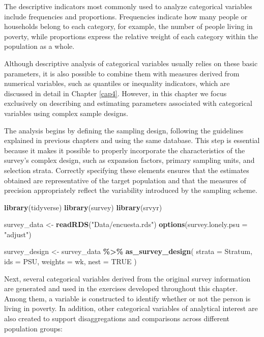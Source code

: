 \documentclass[
  english,
  12pt,
]{book}
\newenvironment{Shaded}{\begin{snugshade}}{\end{snugshade}}
\newcommand{\AttributeTok}[1]{\textcolor[rgb]{0.13,0.29,0.53}{#1}}
\newcommand{\ConstantTok}[1]{\textcolor[rgb]{0.56,0.35,0.01}{#1}}
\newcommand{\FunctionTok}[1]{\textcolor[rgb]{0.13,0.29,0.53}{\textbf{#1}}}
\newcommand{\NormalTok}[1]{#1}
\newcommand{\OtherTok}[1]{\textcolor[rgb]{0.56,0.35,0.01}{#1}}
\newcommand{\SpecialCharTok}[1]{\textcolor[rgb]{0.81,0.36,0.00}{\textbf{#1}}}
\newcommand{\StringTok}[1]{\textcolor[rgb]{0.31,0.60,0.02}{#1}}
\begin{document}
The descriptive indicators most commonly used to analyze categorical variables include frequencies and proportions. Frequencies indicate how many people or households belong to each category, for example, the number of people living in poverty, while proportions express the relative weight of each category within the population as a whole.

Although descriptive analysis of categorical variables usually relies on these basic parameters, it is also possible to combine them with measures derived from numerical variables, such as quantiles or inequality indicators, which are discussed in detail in Chapter \ref{cap4}. However, in this chapter we focus exclusively on describing and estimating parameters associated with categorical variables using complex sample designs.

The analysis begins by defining the sampling design, following the guidelines explained in previous chapters and using the same database. This step is essential because it makes it possible to properly incorporate the characteristics of the survey's complex design, such as expansion factors, primary sampling units, and selection strata. Correctly specifying these elements ensures that the estimates obtained are representative of the target population and that the measures of precision appropriately reflect the variability introduced by the sampling scheme.

\begin{Shaded}
\begin{Highlighting}[]
\FunctionTok{library}\NormalTok{(tidyverse)}
\FunctionTok{library}\NormalTok{(survey)}
\FunctionTok{library}\NormalTok{(srvyr)}

\NormalTok{survey\_data }\OtherTok{\textless{}{-}} \FunctionTok{readRDS}\NormalTok{(}\StringTok{"Data/encuesta.rds"}\NormalTok{)}
\FunctionTok{options}\NormalTok{(}\AttributeTok{survey.lonely.psu =} \StringTok{"adjust"}\NormalTok{)}

\NormalTok{survey\_design }\OtherTok{\textless{}{-}}\NormalTok{ survey\_data }\SpecialCharTok{\%\textgreater{}\%}
  \FunctionTok{as\_survey\_design}\NormalTok{(}
    \AttributeTok{strata =}\NormalTok{ Stratum,}
    \AttributeTok{ids =}\NormalTok{ PSU,}
    \AttributeTok{weights =}\NormalTok{ wk,}
    \AttributeTok{nest =} \ConstantTok{TRUE}
\NormalTok{  )}
\end{Highlighting}
\end{Shaded}

Next, several categorical variables derived from the original survey information are generated and used in the exercises developed throughout this chapter. Among them, a variable is constructed to identify whether or not the person is living in poverty. In addition, other categorical variables of analytical interest are also created to support disaggregations and comparisons across different population groups:
\end{document}
